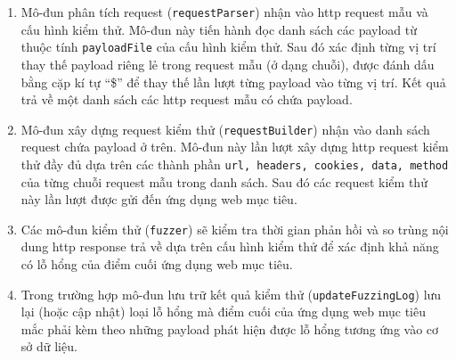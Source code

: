 \begin{enumerate}
    \item Mô-đun phân tích request (\texttt{requestParser}) nhận vào \acrshort{http} request mẫu và cấu hình kiểm thử. Mô-đun này tiến hành đọc danh sách các payload từ thuộc tính \texttt{payloadFile} của cấu hình kiểm thử. Sau đó xác định từng vị trí thay thế payload riêng lẻ trong request mẫu (ở dạng chuỗi), được đánh dấu bằng cặp kí tự ``\$'' để thay thế lần lượt từng payload vào từng vị trí. Kết quả trả về một danh sách các \acrshort{http} request mẫu có chứa payload.
    \item Mô-đun xây dựng request kiểm thử (\texttt{requestBuilder}) nhận vào danh sách request chứa payload ở trên. Mô-đun này lần lượt xây dựng \acrshort{http} request kiểm thử đầy đủ dựa trên các thành phần \texttt{url, headers, cookies, data, method} của từng chuỗi request mẫu trong danh sách. Sau đó các request kiểm thử này lần lượt được gửi đến ứng dụng web mục tiêu.
    \item Các mô-đun kiểm thử (\texttt{fuzzer}) sẽ kiểm tra thời gian phản hồi và so trùng nội dung \acrshort{http} response trả về dựa trên cấu hình kiểm thử để xác định khả năng có lỗ hổng của điểm cuối ứng dụng web mục tiêu. 
    \item Trong trường hợp mô-đun lưu trữ kết quả kiểm thử (\texttt{updateFuzzingLog}) lưu lại (hoặc cập nhật) loại lỗ hổng mà điểm cuối của ứng dụng web mục tiêu mắc phải kèm theo những payload phát hiện được lỗ hổng tương ứng vào cơ sở dữ liệu.
\end{enumerate}

